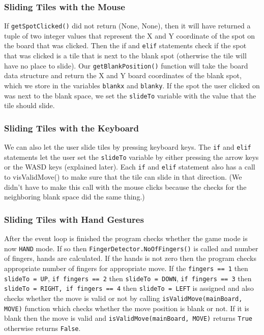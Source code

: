 \subsubsection{Sliding Tiles with the Mouse} %
\label{sec:subsection label} %
If \texttt{getSpotClicked()} did not return (None, None), then it will have returned a tuple of two integer values that represent the X and Y coordinate of the spot on the board that was clicked. Then the if and \texttt{elif} statements check if the spot that was clicked is a tile that is next to the blank spot (otherwise the tile will have no place to slide).
Our \texttt{getBlankPosition()} function will take the board data structure and return the X and Y board coordinates of the blank spot, which we store in the variables \texttt{blankx} and \texttt{blanky}. If the spot the user clicked on was next to the blank space, we set the \texttt{slideTo} variable with the value that the tile should slide.

\subsubsection{Sliding Tiles with the Keyboard} %
\label{sec:subsection label} %
We can also let the user slide tiles by pressing keyboard keys. The \texttt{if} and \texttt{elif} statements let the user set the \texttt{slideTo} variable by either pressing the arrow keys or the WASD keys (explained later). Each \texttt{if} and \texttt{elif} statement also has a call to v{isValidMove()} to make sure that the tile can slide in that direction. (We didn’t have to make this call with the mouse clicks because the checks for the neighboring blank space did the same thing.)
\subsubsection{Sliding Tiles with Hand Gestures} %
\label{sec:subsection label} %
After the event loop is finished the program checks whether the game mode is now \texttt{HAND} mode. If so then \texttt{FingerDetector.NoOfFingers()} is called and number of fingers, hands are calculated. If the hands is not zero then the program checks appropriate number of fingers for appropriate move. If the \texttt{fingers == 1} then \texttt{slideTo = UP}, \texttt{if fingers == 2} then \texttt{slideTo = DOWN}, \texttt{if fingers == 3} then \texttt{slideTo = RIGHT, if fingers == 4} then \texttt{slideTo = LEFT}  is assigned and also checks whether the move is valid or not by calling \texttt{isValidMove(mainBoard, MOVE)} function which checks whether the move position is blank or not. If it is blank then the move is valid and \texttt{isValidMove(mainBoard, MOVE)} returns \texttt{True} otherwise returns \texttt{False}.
